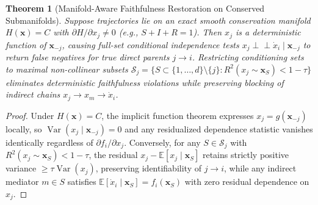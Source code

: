 \documentclass[10pt]{article} %
\newtheorem{theorem}{Theorem}
\begin{document}
\begin{theorem}[Manifold-Aware Faithfulness Restoration on Conserved Submanifolds]
\label{thm:faithfulness}
Suppose trajectories lie on an exact smooth conservation manifold $H(\mathbf{x}) = C$ with $\partial H/\partial x_j \neq 0$ (e.g., $S+I+R=1$). Then $x_j$ is a deterministic function of $\mathbf{x}_{-j}$, causing full-set conditional independence tests $x_j \perp\!\!\!\perp \dot{x}_i \mid \mathbf{x}_{-j}$ to return false negatives for true direct parents $j \to i$. Restricting conditioning sets to maximal non-collinear subsets $\mathcal{S}_j = \{ S \subset \{1,\dots,d\}\setminus\{j\} : R^2(x_j \sim \mathbf{x}_S) < 1 - \tau \}$ eliminates deterministic faithfulness violations while preserving blocking of indirect chains $x_j \to x_m \to \dot{x}_i$.
\end{theorem}
\begin{proof}
Under $H(\mathbf{x})=C$, the implicit function theorem expresses $x_j = g(\mathbf{x}_{-j})$ locally, so $\operatorname{Var}(x_j \mid \mathbf{x}_{-j}) = 0$ and any residualized dependence statistic vanishes identically regardless of $\partial f_i/\partial x_j$. Conversely, for any $S \in \mathcal{S}_j$ with $R^2(x_j \sim \mathbf{x}_S) < 1-\tau$, the residual $x_j - \mathbb{E}[x_j \mid \mathbf{x}_S]$ retains strictly positive variance $\ge \tau \operatorname{Var}(x_j)$, preserving identifiability of $j \to i$, while any indirect mediator $m \in S$ satisfies $\mathbb{E}[\dot{x}_i \mid \mathbf{x}_S] = f_i(\mathbf{x}_S)$ with zero residual dependence on $x_j$.
\end{proof}
\end{document}
